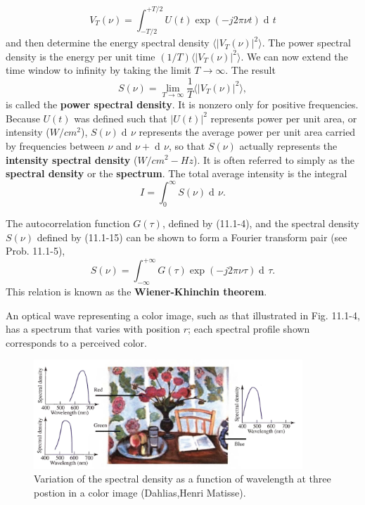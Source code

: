 \documentclass{article}
\numberwithin{figure}{subsection}
\numberwithin{table}{subsection}
\DeclareMathOperator\dif{d\!}
\begin{document}
\begin{equation}
V_T (\nu) = \int_{-T/2}^{+T/2} U(t) \exp(-j2 \pi \nu t) \dif t
\end{equation}
and then determine the energy spectral density   $ \langle \lvert V_T (\nu) \rvert ^2 \rangle $. The power spectral density is the energy per unit time $ (1/T) \langle \lvert V_T (\nu) \rvert ^2 \rangle $.  We can now extend the time window to infinity by taking the limit $ T \to \infty $. The result
\begin{equation}
S(\nu) = \lim_{T \to \infty} \frac{1}{T} \langle \lvert V_T (\nu) \rvert ^2 \rangle ,
\end{equation}
is called the \textbf{power spectral density}. It is nonzero only for positive frequencies. Because $ U(t) $ was defined such that $ \lvert U(t) \rvert^2 $ represents power per unit area, or intensity ($ W/cm^2 $), $ S(\nu) \dif \nu $ represents the average power per unit area carried by frequencies between $ \nu $ and $ \nu + \dif \nu $, so that $ S(\nu) $ actually represents the \textbf{intensity spectral density} ($ W/cm^2 -Hz $). It is often referred to simply as the \textbf{spectral density} or the \textbf{spectrum}. The total average intensity is the integral
\begin{equation}
I = \int_0^\infty S(\nu) \dif \nu .
\end{equation}
\par The autocorrelation function $ G(\tau) $, defined by (11.1-4), and the spectral density $ S(\nu) $ defined by (11.1-15) can be shown to form a Fourier transform pair (see Prob. 11.1-5),
\begin{equation}
S(\nu) = \int_{-\infty}^{+\infty} G(\tau) \exp(-j2 \pi \nu \tau) \dif \tau .
\end{equation}
This relation is known as the \textbf{Wiener-Khinchin theorem}.\\
\par An optical wave representing a color image, such as that illustrated in Fig. 11.1-4, has a spectrum that varies with position $ r $; each spectral profile shown corresponds to a perceived color.
\begin{figure}[ht]
\centering
\includegraphics[width=0.9\textwidth]{11_1_4.PNG}
\caption{Variation of the spectral density as a function of wavelength at three postion in a color image (Dahlias,Henri Matisse).}
\label{fig: 11_1_4}
\end{figure}
\end{document}
